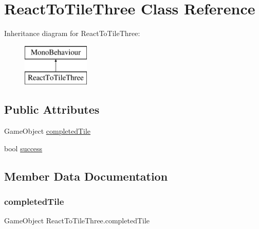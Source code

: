 \hypertarget{class_react_to_tile_three}{}\section{React\+To\+Tile\+Three Class Reference}
\label{class_react_to_tile_three}
Inheritance diagram for React\+To\+Tile\+Three\+:\begin{figure}[H]
\begin{center}
\leavevmode
\includegraphics[height=2.000000cm]{class_react_to_tile_three}
\end{center}
\end{figure}
\subsection*{Public Attributes}
\begin{DoxyCompactItemize}
\item 
Game\+Object \hyperlink{class_react_to_tile_three_a2b5db079268f3d137519e023cc1c54b7}{completed\+Tile}
\item 
bool \hyperlink{class_react_to_tile_three_a182a27d7cfb68a9ce929c0037d02dc55}{success}
\end{DoxyCompactItemize}


\subsection{Member Data Documentation}
\mbox{\label{class_react_to_tile_three_a2b5db079268f3d137519e023cc1c54b7}} 
\subsubsection{\texorpdfstring{completed\+Tile}{completedTile}}
{\footnotesize\ttfamily Game\+Object React\+To\+Tile\+Three.\+completed\+Tile}

\mbox{\label{class_react_to_tile_three_a182a27d7cfb68a9ce929c0037d02dc55}} 
